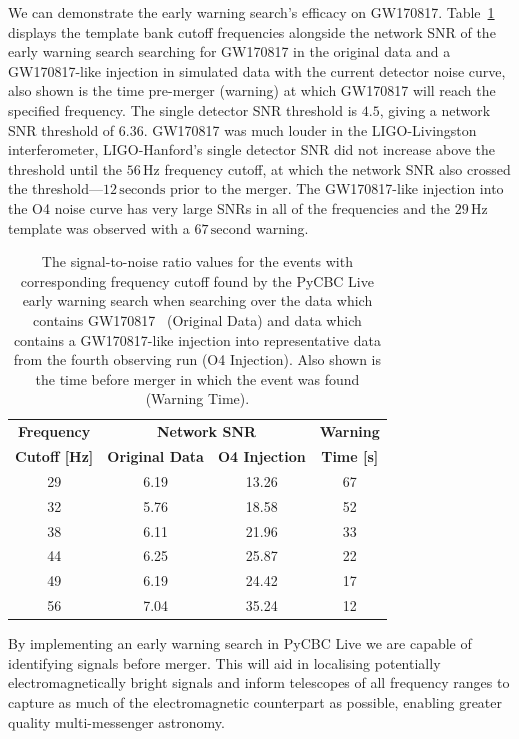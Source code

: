 We can demonstrate the early warning search's efficacy on GW170817. Table~\ref{6:tab:gw170817_early_warning} displays the template bank cutoff frequencies alongside the network SNR of the early warning search searching for GW170817 in the original data and a GW170817-like injection in simulated data with the current detector noise curve, also shown is the time pre-merger (warning) at which GW170817 will reach the specified frequency. The single detector SNR threshold is $4.5$, giving a network SNR threshold of $6.36$. GW170817 was much louder in the LIGO-Livingston interferometer, LIGO-Hanford's single detector SNR did not increase above the threshold until the $56 \, \text{Hz}$ frequency cutoff, at which the network SNR also crossed the threshold---$12 \, \text{seconds}$ prior to the merger. The GW170817-like injection into the O4 noise curve has very large SNRs in all of the frequencies and the $29 \, \text{Hz}$ template was observed with a $67 \, \text{second}$ warning.
%
\begin{table}[ht]
    \centering
    \setlength{\tabcolsep}{4pt}
    \begin{tabular}{cccc}
        \toprule
        \multicolumn{1}{c}{\textbf{Frequency}} & \multicolumn{2}{c}{\textbf{Network SNR}} & \multicolumn{1}{c}{\textbf{Warning}} \\
        \cmidrule(lr){1-4}
        \textbf{Cutoff [Hz]} & \textbf{Original Data} & \textbf{O4 Injection} & \textbf{Time [s]} \\
        \midrule
        29 & 6.19 & 13.26 & 67 \\
        32 & 5.76 & 18.58 & 52 \\
        38 & 6.11 & 21.96 & 33 \\
        44 & 6.25 & 25.87 & 22 \\
        49 & 6.19 & 24.42 & 17 \\
        56 & 7.04 & 35.24 & 12 \\
        \bottomrule
    \end{tabular}
    \caption{The signal-to-noise ratio values for the \gwadj events with corresponding frequency cutoff found by the PyCBC Live early warning search when searching over the data which contains GW170817~\cite{GW170817:2017} (Original Data) and data which contains a GW170817-like injection into representative data from the fourth observing run (O4 Injection). Also shown is the time before merger in which the event was found (Warning Time).}
    \label{6:tab:gw170817_early_warning}
\end{table}
%
By implementing an early warning search in PyCBC Live we are capable of identifying \gwadj signals before merger. This will aid in localising potentially electromagnetically bright \gwadj signals and inform telescopes of all frequency ranges to capture as much of the electromagnetic counterpart as possible, enabling greater quality multi-messenger astronomy.


